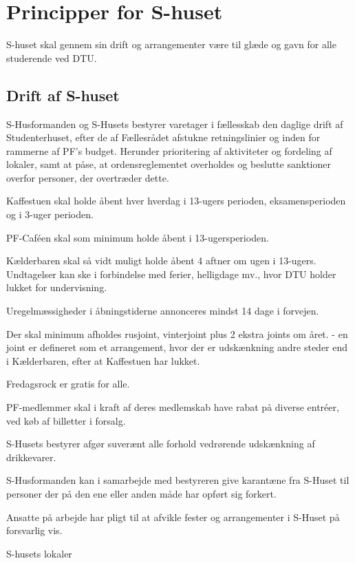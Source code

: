 \section{Principper for S-huset}
S-huset skal gennem sin drift og arrangementer være til glæde og gavn for alle studerende ved DTU.
\subsection{Drift af S-huset}
\begin{list}{•}
\item S-Husformanden og S-Husets bestyrer varetager i fællesskab den daglige drift af Studenterhuset, efter de af
Fællesrådet afstukne retningslinier og inden for rammerne af PF's budget. Herunder prioritering af aktiviteter og
fordeling af lokaler, samt at påse, at ordensreglementet overholdes og beslutte sanktioner overfor personer, der
overtræder dette.
\item Kaffestuen skal holde åbent hver hverdag i 13-ugers perioden, eksamensperioden og i 3-uger perioden.
\item PF-Caféen skal som minimum holde åbent i 13-ugersperioden.
\item Kælderbaren skal så vidt muligt holde åbent 4 aftner om ugen i 13-ugers. Undtagelser kan ske i forbindelse med
ferier, helligdage mv., hvor DTU holder lukket for undervisning.
\item Uregelmæssigheder i åbningstiderne annonceres mindst 14 dage i forvejen.
\item Der skal minimum afholdes rusjoint, vinterjoint plus 2 ekstra joints om året.
- en joint er defineret som et arrangement, hvor der er udskænkning andre steder end i Kælderbaren, efter at
Kaffestuen har lukket.
\item Fredagsrock er gratis for alle.
\item PF-medlemmer skal i kraft af deres medlemskab have rabat på diverse entréer, ved køb af billetter i forsalg.
\item S-Husets bestyrer afgør suverænt alle forhold vedrørende udskænkning af drikkevarer.
\item S-Husformanden kan i samarbejde med bestyreren give karantæne fra S-Huset til personer der på den ene eller
anden måde har opført sig forkert.
\item Ansatte på arbejde har pligt til at afvikle fester og arrangementer i S-Huset på forsvarlig vis.
\end{list}
S-husets lokaler
